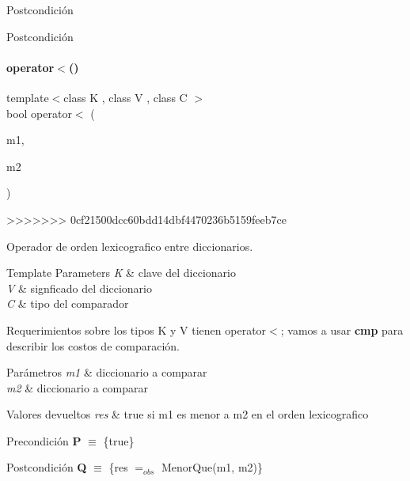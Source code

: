 \begin{DoxyPostcond}{\-Postcondición}
\begin{DoxyPostcond}{\-Postcondición}
\paragraph{\texorpdfstring{operator$<$()}{operator<()}}
{\footnotesize\ttfamily template$<$class K , class V , class C $>$ \\
bool operator$<$ (\begin{DoxyParamCaption}\item[{const \hyperlink{classaed2_1_1map}{map}$<$ K, V, C $>$ \&}]{m1,  }\item[{const \hyperlink{classaed2_1_1map}{map}$<$ K, V, C $>$ \&}]{m2 }\end{DoxyParamCaption})\hspace{0.3cm}{\ttfamily [related]}}
>>>>>>> 0cf21500dcc60bdd14dbf4470236b5159feeb7ce



Operador de orden lexicografico entre diccionarios. 


\begin{DoxyTemplParams}{Template Parameters}
{\em K} & clave del diccionario \\
\hline
{\em V} & signficado del diccionario \\
\hline
{\em C} & tipo del comparador\\
\hline
\end{DoxyTemplParams}
\begin{DoxyParagraph}{Requerimientos sobre los tipos}
K y V tienen operator$<$; vamos a usar {\bfseries cmp} para describir los costos de comparación.
\end{DoxyParagraph}

\begin{DoxyParams}{Parámetros}
{\em m1} & diccionario a comparar \\
\hline
{\em m2} & diccionario a comparar \\
\hline
\end{DoxyParams}

\begin{DoxyRetVals}{Valores devueltos}
{\em res} & true si m1 es menor a m2 en el orden lexicografico\\
\hline
\end{DoxyRetVals}
\begin{DoxyPrecond}{Precondición}
{\bfseries P} $\equiv$ \{true\} 
\end{DoxyPrecond}
\begin{DoxyPostcond}{Postcondición}
{\bfseries Q} $\equiv$ \{res $=_{obs}$ Menor\+Que(m1, m2)\}
\end{DoxyPostcond}


\end{DoxyPostcond}
\end{DoxyPostcond}
